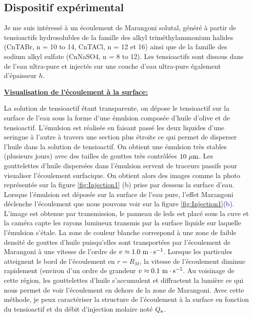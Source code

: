 \documentclass[french, 10pt]{article}
\begin{document}

\subsection{Dispositif expérimental}


Je me suis intéressé à un écoulement de Marangoni solutal, généré à partir de tensioactifs hydrosolubles de la famille des alkyl triméthylammonium halides (CnTABr, n = 10 to 14, CnTACl, n = 12 et 16) ainsi que de la famille des sodium alkyl sulfate (CnNaSO4, n = 8 to 12). Les tensioactifs sont dissous dans de l'eau ultra-pure et injectés sur une couche d'eau ultra-pure également d'épaisseur $h$. 

\noindent\underline{\textbf{Visualisation de l'écoulement à la surface:}}\medskip

La solution de tensioactif étant transparente, on dépose le tensioactif sur la surface de l'eau sous la forme d'une émulsion composée d’huile d'olive et de tensioactif. L'émulsion est réalisée en faisant passé les deux liquides d'une seringue à l'autre à travers une section plus étroite ce qui permet de disperser l'huile dans la solution de tensioactif. On obtient une émulsion très stables (plusieurs jours) avec des tailles de gouttes très contrôlées $10~\rm \mu m$. Les gouttelettes d'huile dispersées dans l'émulsion servent de traceurs passifs pour visualiser l'écoulement surfacique. On obtient alors des images comme la photo représentée sur la figure \ref{fig:Injection1} (b) prise par desssus la surface d'eau. Lorsque l'émulsion est déposée sur la surface de l'eau pure, l'effet Marangoni déclenche l'écoulement que nous pouvons voir sur la figure \ref{fig:Injection1}\textcolor{blue}{(b)}. L'image est obtenue par transmission, le panneau de leds est placé sous la cuve et la caméra capte les rayons lumineux transmis par la surface liquide sur laquelle l'émulsion s'étale. La zone de couleur blanche correspond à une zone de faible densité de gouttes d'huile puisqu'elles sont transportées par l'écoulement de Marangoni à une vitesse de l'ordre de $v\approx 1.0~\rm m\cdot s^{-1}$. Lorsque les particules atteignent le bord de l'écoulement en $r=R_{M}$, la vitesse de l'écoulement diminue rapidement (environ d'un ordre de grandeur $v\approx 0.1~\rm m\cdot s^{-1}$. Au voisinage de cette région, les gouttelettes d'huile s'accumulent et diffractent la lumière ce qui nous permet de voir l'écoulement en dehors de la zone de Marangoni. Avec cette méthode, je peux caractériser la structure de l'écoulement à la surface en fonction du tensioactif et du débit d'injection molaire noté $Q_{\rm a}$.\medskip
\end{document}
